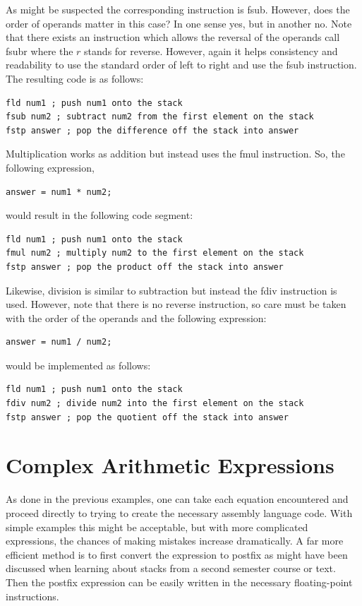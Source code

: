 \documentclass[10pt]{book}
\begin{document}
As might be suspected the corresponding instruction is fsub. However, does the order of operands matter in this case? In one sense yes, but in another no. Note that there exists an instruction which allows the reversal of the operands call fsubr where the $r$ stands for reverse. However, again it helps consistency and readability to use the standard order of left to right and use the fsub instruction. The resulting code is as follows:

\begin{verbatim}
fld num1 ; push num1 onto the stack
fsub num2 ; subtract num2 from the first element on the stack
fstp answer ; pop the difference off the stack into answer
\end{verbatim}

Multiplication works as addition but instead uses the fmul instruction. So, the following expression,

\begin{verbatim}
answer = num1 * num2;
\end{verbatim}

would result in the following code segment:

\begin{verbatim}
fld num1 ; push num1 onto the stack
fmul num2 ; multiply num2 to the first element on the stack
fstp answer ; pop the product off the stack into answer
\end{verbatim}

Likewise, division is similar to subtraction but instead the fdiv instruction is used. However, note that there is no reverse instruction, so care must be taken with the order of the operands and the following expression:

\begin{verbatim}
answer = num1 / num2;
\end{verbatim}

would be implemented as follows:

\begin{verbatim}
fld num1 ; push num1 onto the stack
fdiv num2 ; divide num2 into the first element on the stack
fstp answer ; pop the quotient off the stack into answer
\end{verbatim}

\section{Complex Arithmetic Expressions}
As done in the previous examples, one can take each equation encountered and proceed directly to trying to create the necessary assembly language code. With simple examples this might be acceptable, but with more complicated expressions, the chances of making mistakes increase dramatically. A far more efficient method is to first convert the expression to postfix as might have been discussed when learning about stacks from a second semester course or text. Then the postfix expression can be easily written in the necessary floating-point instructions.
\end{document}
